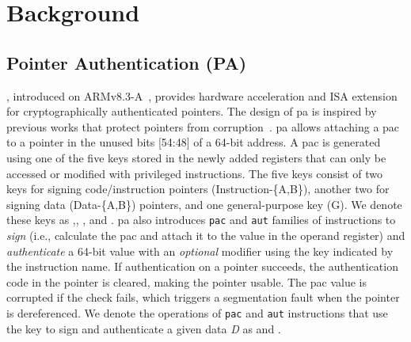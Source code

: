 

\section{Background}

\subsection{Pointer Authentication (PA)}
\label{sec:background:pac}
\emph{}, introduced on ARMv8.3-A~\cite{arm-arch}, provides hardware acceleration and ISA extension for cryptographically authenticated pointers.
The design of \gls{pa} is inspired by previous works that protect pointers from corruption~\cite{ccfi,cpi}.
\gls{pa} allows attaching a \gls{pac} to a pointer in the unused bits [54:48] of a 64-bit address.
A \gls{pac} is generated using one of the five keys stored in the newly added registers that can only be accessed or modified with privileged instructions.
The five keys consist of two keys for signing code/instruction pointers (Instruction-\{A,B\}), another two for signing data (Data-\{A,B\}) pointers, and one general-purpose key (G).
We denote these keys as ,, ,  and .
\Gls{pa} also introduces \texttt{pac} and \texttt{aut} families of instructions to \emph{sign} (i.e., calculate the \gls{pac} and attach it to the value in the operand register) and \emph{authenticate} a 64-bit value with an \emph{optional} modifier using the key indicated by the instruction name.
If authentication on a pointer succeeds, the authentication code in the pointer is cleared, making the pointer usable.
The \gls{pac} value is corrupted if the check fails, which triggers a segmentation fault when the pointer is dereferenced.
We denote the operations of \texttt{pac} and \texttt{aut} instructions that use the key \key{} to sign and authenticate a given data \emph{D} as  and .


